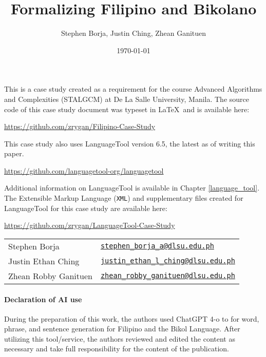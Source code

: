 \documentclass[12pt]{book}
\title{Formalizing Filipino and Bikolano}
\author{Stephen Borja, Justin Ching, Zhean Ganituen}
\date{\today}
\begin{document}
\maketitle

This is a case study created as a requirement for the course Advanced Algorithms and Complexities (STALGCM) at De La Salle University, Manila. The source code of this case study document was typeset in \LaTeX\, and is available here:

\begin{center}
  \url{https://github.com/zrygan/Filipino-Case-Study}
\end{center}

This case study also uses LanguageTool version 6.5, the latest as of writing this paper. 

\begin{center}
    \url{https://github.com/languagetool-org/languagetool} 
\end{center}

Additional information on LanguageTool is available in Chapter \ref{language_tool}. The Extensible Markup Language  (\texttt{XML}) and supplementary files created for LanguageTool for this case study are available here:

\label{languageTool_implementation}
\begin{center}
  \url{https://github.com/zrygan/LanguageTool-Case-Study}
\end{center}

\vspace*{\fill}

\begin{tabular}{l l}
  Stephen Borja        & \href{mailto:stephen_borja_a@dlsu.edu.ph}{\texttt{stephen\_borja\_a@dlsu.edu.ph}}            \\
  Justin Ethan Ching   & \href{mailto:justin_ethan_l_ching@dlsu.edu.ph}{\texttt{justin\_ethan\_l\_ching@dlsu.edu.ph}} \\
  Zhean Robby Ganituen & \href{mailto:zhean_robby_ganituen@dlsu.edu.ph}{\texttt{zhean\_robby\_ganituen@dlsu.edu.ph}}  \\
\end{tabular}

\tableofcontents
\lstlistoflistings








\paragraph{Declaration of AI use}

During the preparation of this work, the authors used ChatGPT 4-o to for word, phrase, and sentence generation for Filipino and the Bikol Language. After utilizing this tool/service, the authors reviewed and edited the content as necessary and take full responsibility for the content of the publication.


\printbibliography
\end{document}

